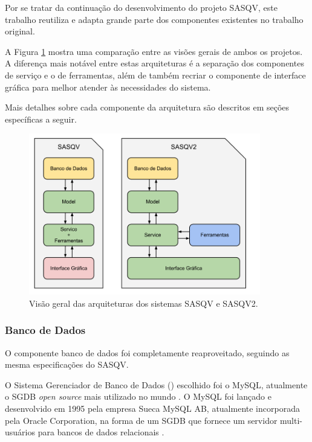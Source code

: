 Por se tratar da continuação do desenvolvimento do projeto SASQV, este trabalho reutiliza e adapta grande parte dos componentes existentes no trabalho original.

A Figura \ref{fig:arquitetura} mostra uma comparação entre as visões gerais de ambos os projetos. A diferença mais notável entre estas arquiteturas é a separação dos componentes de serviço e o de ferramentas, além de também recriar o componente de interface gráfica para melhor atender às necessidades do sistema.

Mais detalhes sobre cada componente da arquitetura são descritos em seções específicas a seguir.

\begin{figure}[!htb]
	\centering
	\includegraphics[width=0.9\textwidth]{./imgs/arquitetura.png}
	\caption{Visão geral das arquiteturas dos sistemas SASQV e SASQV2.}
	\label{fig:arquitetura}
\end{figure}

\subsubsection{Banco de Dados}

O componente banco de dados foi completamente reaproveitado, seguindo as mesma especificações do SASQV.

O Sistema Gerenciador de Banco de Dados () escolhido foi o MySQL, atualmente o SGDB \emph{open source} mais utilizado no mundo \cite{mysqlmarket}.
O MySQL foi lançado e desenvolvido em 1995 pela empresa Sueca MySQL AB, atualmente incorporada pela Oracle Corporation, na forma de um SGDB que fornece um servidor multi-usuários para bancos de dados relacionais \cite{wikipediamysql}.


